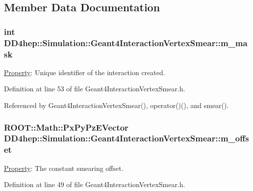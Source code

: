 \subsection{Member Data Documentation}
\hypertarget{class_d_d4hep_1_1_simulation_1_1_geant4_interaction_vertex_smear_a1862cd4719c77831e20725e7228bd6f1}{
\subsubsection[{m\_\-mask}]{\setlength{\rightskip}{0pt plus 5cm}int {\bf DD4hep::Simulation::Geant4InteractionVertexSmear::m\_\-mask}}}
\label{class_d_d4hep_1_1_simulation_1_1_geant4_interaction_vertex_smear_a1862cd4719c77831e20725e7228bd6f1}


\hyperlink{class_d_d4hep_1_1_property}{Property}: Unique identifier of the interaction created. 

Definition at line 53 of file Geant4InteractionVertexSmear.h.

Referenced by Geant4InteractionVertexSmear(), operator()(), and smear().\hypertarget{class_d_d4hep_1_1_simulation_1_1_geant4_interaction_vertex_smear_a34e2bcca2e7e15bad2fae703422fa22c}{
\subsubsection[{m\_\-offset}]{\setlength{\rightskip}{0pt plus 5cm}ROOT::Math::PxPyPzEVector {\bf DD4hep::Simulation::Geant4InteractionVertexSmear::m\_\-offset}}}
\label{class_d_d4hep_1_1_simulation_1_1_geant4_interaction_vertex_smear_a34e2bcca2e7e15bad2fae703422fa22c}


\hyperlink{class_d_d4hep_1_1_property}{Property}: The constant smearing offset. 

Definition at line 49 of file Geant4InteractionVertexSmear.h.

